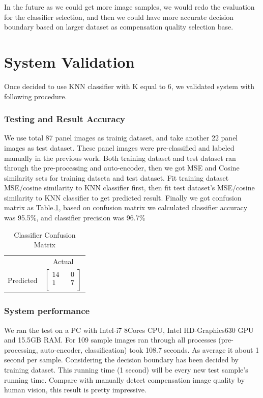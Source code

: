 \documentclass[runningheads]{llncs}
\begin{document}
In the future as we could get more image samples, we would redo the evaluation for the classifier selection, and then we could have more accurate decision boundary based on larger dataset as compensation quality selection base.

\section{System Validation}
Once decided to use KNN classifier with K equal to 6,  we validated system with following procedure.
\subsubsection{Testing and Result Accuracy}
We use total 87 panel images as trainig dataset, and take another 22 panel images as test dataset. These panel images were pre-classified and labeled manually in the previous work. Both training dataset and test dataset ran through the pre-processing and auto-encoder, then we got MSE and Cosine similarity sets for training datseta and test dataset. Fit training dataset MSE/cosine similarity to KNN classifier first, then fit test dataset's MSE/cosine similarity to KNN classifier to get predicted result.
Finally we got confusion matrix as Table.\ref{tab:cm}, based on confusion matrix we calculated classifier accuracy was 95.5\%, and classifier precision was 96.7\%\\
\begin{table}
    \centering
    \caption{Classifier Confusion Matrix}
    \label{tab:cm}
    \begin{tabular}{cc}
         & Actual \\
        Predicted & $\begin{bmatrix} 14 & & 0 \\ 1 & & 7\\ \end{bmatrix}$\\
    \end{tabular}
\end{table}
\subsubsection{System performance}
We ran the test on a PC with Intel-i7 8Cores CPU, Intel HD-Graphics630 GPU and 15.5GB RAM. For 109 sample images ran through all processes (pre-processing, auto-encoder, classification) took 108.7 seconds. As average it about 1 second per sample. Considering the decision boundary has been decided by training dataset. This running time (1 second) will be every new test sample's running time. Compare with manually detect compensation image quality by human vision, this result is pretty impressive.
\end{document}
